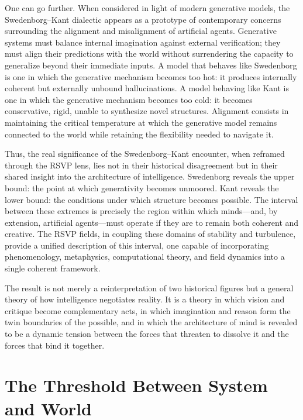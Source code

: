 \documentclass[12pt]{article}
\begin{document}
One can go further. When considered in light of modern generative models, the 
Swedenborg–Kant dialectic appears as a prototype of contemporary concerns 
surrounding the alignment and misalignment of artificial agents. Generative 
systems must balance internal imagination against external verification; they 
must align their predictions with the world without surrendering the capacity 
to generalize beyond their immediate inputs. A model that behaves like 
Swedenborg is one in which the generative mechanism becomes too hot: it 
produces internally coherent but externally unbound hallucinations. A model 
behaving like Kant is one in which the generative mechanism becomes too cold: 
it becomes conservative, rigid, unable to synthesize novel structures.  
Alignment consists in maintaining the critical temperature at which the 
generative model remains connected to the world while retaining the flexibility 
needed to navigate it.

Thus, the real significance of the Swedenborg–Kant encounter, when reframed 
through the RSVP lens, lies not in their historical disagreement but in their 
shared insight into the architecture of intelligence. Swedenborg reveals the 
upper bound: the point at which generativity becomes unmoored. Kant reveals the 
lower bound: the conditions under which structure becomes possible. The interval 
between these extremes is precisely the region within which minds—and, by 
extension, artificial agents—must operate if they are to remain both coherent 
and creative. The RSVP fields, in coupling these domains of stability and 
turbulence, provide a unified description of this interval, one capable of 
incorporating phenomenology, metaphysics, computational theory, and field 
dynamics into a single coherent framework.

The result is not merely a reinterpretation of two historical figures but a 
general theory of how intelligence negotiates reality. It is a theory in which 
vision and critique become complementary acts, in which imagination and reason 
form the twin boundaries of the possible, and in which the architecture of mind 
is revealed to be a dynamic tension between the forces that threaten to dissolve 
it and the forces that bind it together.

\newpage
\section{The Threshold Between System and World}
\end{document}
